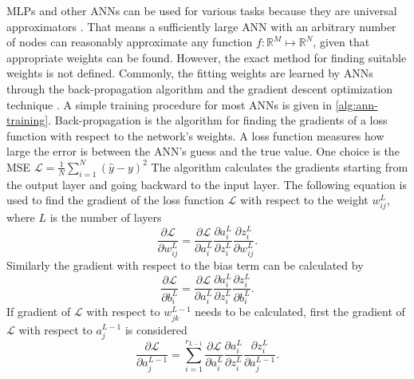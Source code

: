 \glspl{MLP} and other \glspl{ANN} can be used for various tasks because they are universal approximators \cite{cybenkotApproximationSuperpositionsSigmoidal, hornikApproximationCapabilitiesMultilayer1991, hornikMultilayerFeedforwardNetworks1989}.
That means a sufficiently large \gls{ANN} with an arbitrary number of nodes can reasonably approximate any function $f: \mathbb{R}^M \mapsto \mathbb{R}^N$, given that appropriate weights can be found.
However, the exact method for finding suitable weights is not defined.
Commonly, the fitting weights are learned by \glspl{ANN} through the back-propagation algorithm \cite{rumelhartLearningRepresentationsBackpropagating1986} and the gradient descent optimization technique \cite{ruderOverviewGradientDescent2017}.
A simple training procedure for most \glspl{ANN} is given in \autoref{alg:ann-training}.
Back-propagation is the algorithm for finding the gradients of a loss function with respect to the network's weights.
A loss function measures how large the error is between the \gls{ANN}'s guess and the true value.
One choice is the \gls{MSE} $\mathcal{L} = \frac{1}{N} \sum_{i=1}^N (\hat{y} - y)^2$
The algorithm calculates the gradients starting from the output layer and going backward to the input layer.
The following equation is used to find the gradient of the loss function $\mathcal{L}$ with respect to the weight $w_{ij}^L$, where $L$ is the number of layers
\begin{equation}
    \frac{\partial \mathcal{L}}{\partial w_{ij}^L} = \frac{\partial\mathcal{L}}{\partial a_i^L} \frac{\partial a_i^L}{\partial z_i^L} \frac{\partial z_i^L}{\partial w_{ij}^L}.
    \label{eq:backpropagation-ouput-layer-weights}
\end{equation}
Similarly the gradient with respect to the bias term can be calculated by
\begin{equation}
    \frac{\partial \mathcal{L}}{\partial b_i^L} = \frac{\partial\mathcal{L}}{\partial a_i^L} \frac{\partial a_i^L}{\partial z_i^L} \frac{\partial z_i^L}{\partial b_i^L}.
    \label{eq:backpropagation-ouput-layer-bias}
\end{equation}
If gradient of $\mathcal{L}$ with respect to $w_{jk}^{L-1}$ needs to be calculated, first the gradient of $\mathcal{L}$ with respect to $a_j^{L-1}$ is considered
\begin{equation}
    \frac{\partial \mathcal{L}}{\partial a_j^{L-1}} = \sum_{i=1}^{r_{L-1}} \frac{\partial\mathcal{L}}{\partial a_i^L} \frac{\partial a_i^L}{\partial z_i^L} \frac{\partial z_i^L}{\partial a_j^{L-1}}.
    \label{eq:backpropagation-hidden-layer-activation}
\end{equation}
